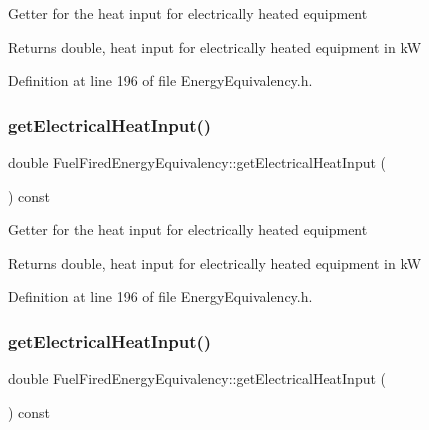 Getter for the heat input for electrically heated equipment

\begin{DoxyReturn}{Returns}
double, heat input for electrically heated equipment in kW 
\end{DoxyReturn}


Definition at line 196 of file Energy\+Equivalency.\+h.

\mbox{\label{class_fuel_fired_energy_equivalency_a7d5878809c01a9243aa999406cddd4a9}} 
\subsubsection{\texorpdfstring{get\+Electrical\+Heat\+Input()}{getElectricalHeatInput()}\hspace{0.1cm}{\footnotesize\ttfamily [2/3]}}
{\footnotesize\ttfamily double Fuel\+Fired\+Energy\+Equivalency\+::get\+Electrical\+Heat\+Input (\begin{DoxyParamCaption}{ }\end{DoxyParamCaption}) const\hspace{0.3cm}{\ttfamily [inline]}}

Getter for the heat input for electrically heated equipment

\begin{DoxyReturn}{Returns}
double, heat input for electrically heated equipment in kW 
\end{DoxyReturn}


Definition at line 196 of file Energy\+Equivalency.\+h.

\mbox{\label{class_fuel_fired_energy_equivalency_a7d5878809c01a9243aa999406cddd4a9}} 
\subsubsection{\texorpdfstring{get\+Electrical\+Heat\+Input()}{getElectricalHeatInput()}\hspace{0.1cm}{\footnotesize\ttfamily [3/3]}}
{\footnotesize\ttfamily double Fuel\+Fired\+Energy\+Equivalency\+::get\+Electrical\+Heat\+Input (\begin{DoxyParamCaption}{ }\end{DoxyParamCaption}) const\hspace{0.3cm}{\ttfamily [inline]}}


